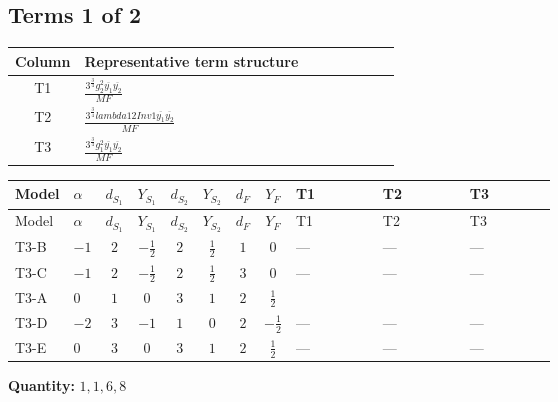 \documentclass[8pt]{article}
\begin{document}
\begin{landscape}
\subsection*{Terms 1 of 2}
\begin{center}
\begin{tabular}{@{}c >{\raggedright\arraybackslash}p{0.82\linewidth}@{}}
\toprule
Column & Representative term structure \\
\midrule
T1 & \(\displaystyle \frac{3^{\frac{3}{4}} g_{2}^{2} \overline{y_{1}} \overline{y_{2}}}{MF}\) \\
\midrule
T2 & \(\displaystyle \frac{3^{\frac{3}{4}} lambda12Inv1 \overline{y_{1}} \overline{y_{2}}}{MF}\) \\
\midrule
T3 & \(\displaystyle \frac{3^{\frac{3}{4}} g_{1}^{2} \overline{y_{1}} \overline{y_{2}}}{MF}\) \\
\midrule
\bottomrule
\end{tabular}
\end{center}
\smallskip
\tiny
\begin{longtable}{@{}llcccccc >{\raggedright\arraybackslash}p{0.21\linewidth} >{\raggedright\arraybackslash}p{0.21\linewidth} >{\raggedright\arraybackslash}p{0.21\linewidth}@{}}
\toprule
Model & $\alpha$ & $d_{S_1}$ & $Y_{S_1}$ & $d_{S_2}$ & $Y_{S_2}$ & $d_F$ & $Y_F$ & T1 & T2 & T3 \\
\midrule
\endfirsthead
\toprule
Model & $\alpha$ & $d_{S_1}$ & $Y_{S_1}$ & $d_{S_2}$ & $Y_{S_2}$ & $d_F$ & $Y_F$ & T1 & T2 & T3 \\
\midrule
\endhead
T3-B & $-1$ & $2$ & $-\frac{1}{2}$ & $2$ & $\frac{1}{2}$ & $1$ & $0$ & --- & --- & --- \\
\midrule
T3-C & $-1$ & $2$ & $-\frac{1}{2}$ & $2$ & $\frac{1}{2}$ & $3$ & $0$ & --- & --- & --- \\
\midrule
T3-A & $0$ & $1$ & $0$ & $3$ & $1$ & $2$ & $\frac{1}{2}$ & \scriptsize\adjustbox{max width=\linewidth}{$\begin{gathered} - \frac{11 \cdot 3^{\frac{3}{4}} g_{2}^{2} \overline{y_{1}} \overline{y_{2}}}{8 MF}\end{gathered}$} & \scriptsize\adjustbox{max width=\linewidth}{$\begin{gathered} - \frac{3^{\frac{3}{4}} lambda12Inv1 \overline{y_{1}} \overline{y_{2}}}{6 MF}\end{gathered}$} & \scriptsize\adjustbox{max width=\linewidth}{$\begin{gathered} - \frac{3^{\frac{3}{4}} g_{1}^{2} \overline{y_{1}} \overline{y_{2}}}{8 MF}\end{gathered}$} \\
\midrule
T3-D & $-2$ & $3$ & $-1$ & $1$ & $0$ & $2$ & $-\frac{1}{2}$ & --- & --- & --- \\
\midrule
T3-E & $0$ & $3$ & $0$ & $3$ & $1$ & $2$ & $\frac{1}{2}$ & --- & --- & --- \\
\midrule
\bottomrule
\end{longtable}
\clearpage
\noindent\textbf{Quantity: }$\mathrm{1,1,6,8}$\par\smallskip

\end{landscape}
\end{document}

